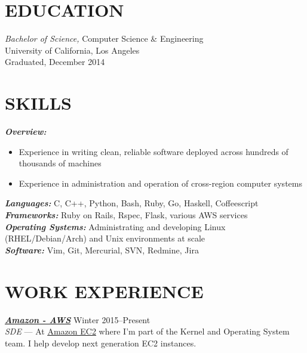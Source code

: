 \documentclass[line,letterpaper]{resume}
\begin{document}
\address{\ }
\address{\ }


\begin{resume}
    \vspace{-24pt}
    \section{\uppercase{Education}} {\sl Bachelor of Science,} \/
    Computer Science \& Engineering \\
    University of California, Los Angeles\\
    Graduated, December 2014 \\

    \vspace{-16pt}

 \section{\uppercase{Skills}}
    {\sl\textbf{Overview:}}\/
	\begin{itemize}
		\item Experience in writing clean, reliable software deployed across hundreds of thousands of machines
		\item Experience in administration and operation of cross-region computer systems
	\end{itemize}
    {\sl\textbf{Languages:}}\/
    C, C++, Python, Bash, Ruby, Go, Haskell, Coffeescript\\
    {\sl\textbf{Frameworks:}}\/
	Ruby on Rails, Rspec, Flask, various AWS services\\
    {\sl\textbf{Operating Systems:}}\/
	Administrating and developing Linux (RHEL/Debian/Arch) and Unix environments at scale\\
    {\sl\textbf{Software:}}\/
	Vim, Git, Mercurial, SVN, Redmine, Jira
    \vspace{-6pt}

	\section{\uppercase{Work Experience}}

	{\sl\textbf{\href{https://aws.amazon.com/}{Amazon - AWS}}} \hfill Winter 2015--Present\\
    \emph{SDE} --- At \underline{\href{http://aws.amazon.com/ec2}
	{Amazon EC2}} where I'm part of the Kernel and Operating System team. I help
	develop next generation EC2 instances.


\end{resume}
\end{document}
